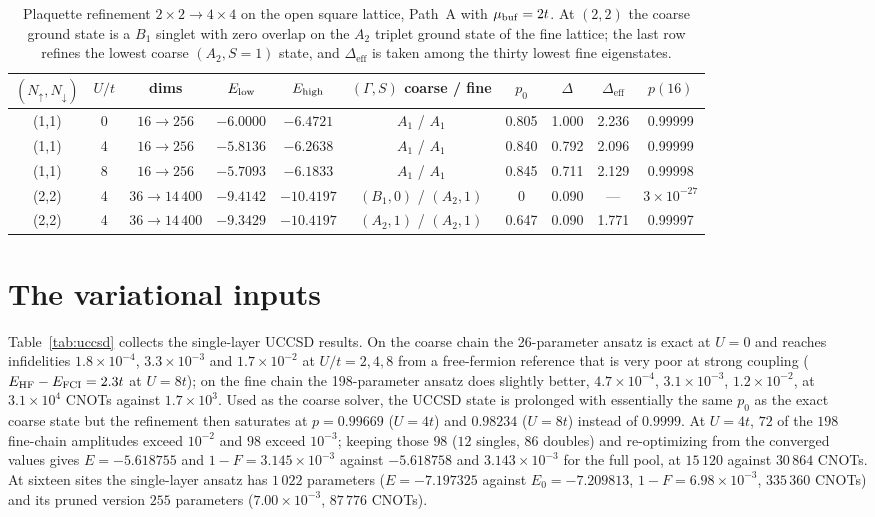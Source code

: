 \documentclass[a4paper,11pt,noarxiv]{quantumarticle}
\newcommand{\Deff}{\Delta_{\mathrm{eff}}}
\begin{document}
\begin{table}[t]
  \caption{Plaquette refinement $2\times2\to4\times4$ on the open square
  lattice, Path~A with $\mu_{\rm buf}=2t$.  At $(2,2)$ the coarse ground
  state is a $B_1$ singlet with zero overlap on the $A_2$ triplet ground
  state of the fine lattice; the last row refines the lowest coarse
  $(A_2,S=1)$ state, and $\Deff$ is taken among the thirty lowest fine
  eigenstates.}
  \label{tab:2d}
  \centering\scriptsize
  \begin{tabular}{cccccccccc}
  \toprule
  $(N_\uparrow,N_\downarrow)$ & $U/t$ & dims & $E_{\rm low}$ & $E_{\rm high}$ & $(\Gamma,S)$ coarse / fine & $p_0$ & $\Delta$ & $\Deff$ & $p(16)$\\
  \midrule
  (1,1) & 0 & $16\to256$ & $-6.0000$ & $-6.4721$ & $A_1$ / $A_1$ & 0.805 & 1.000 & 2.236 & 0.99999\\
  (1,1) & 4 & $16\to256$ & $-5.8136$ & $-6.2638$ & $A_1$ / $A_1$ & 0.840 & 0.792 & 2.096 & 0.99999\\
  (1,1) & 8 & $16\to256$ & $-5.7093$ & $-6.1833$ & $A_1$ / $A_1$ & 0.845 & 0.711 & 2.129 & 0.99998\\
  (2,2) & 4 & $36\to14\,400$ & $-9.4142$ & $-10.4197$ & $(B_1,0)$ / $(A_2,1)$ & 0 & 0.090 & --- & $3\times10^{-27}$\\
  (2,2) & 4 & $36\to14\,400$ & $-9.3429$ & $-10.4197$ & $(A_2,1)$ / $(A_2,1)$ & 0.647 & 0.090 & 1.771 & 0.99997\\
  \bottomrule
  \end{tabular}
\end{table}

\section{The variational inputs}
\label{sm:uccsd}
Table~\ref{tab:uccsd} collects the single-layer UCCSD results.  On the
coarse chain the 26-parameter ansatz is exact at $U=0$ and reaches
infidelities $1.8\times10^{-4}$, $3.3\times10^{-3}$ and $1.7\times10^{-2}$
at $U/t=2,4,8$ from a free-fermion reference that is very poor at strong
coupling ($E_{\rm HF}-E_{\rm FCI}=2.3t$ at $U=8t$); on the fine chain the
198-parameter ansatz does slightly better, $4.7\times10^{-4}$,
$3.1\times10^{-3}$, $1.2\times10^{-2}$, at $3.1\times10^4$ CNOTs against
$1.7\times10^3$.  Used as the coarse solver, the UCCSD state is prolonged
with essentially the same $p_0$ as the exact coarse state but the
refinement then saturates at $p=0.99669$ ($U=4t$) and $0.98234$ ($U=8t$)
instead of $0.9999$.  At $U=4t$, $72$ of the $198$ fine-chain amplitudes
exceed $10^{-2}$ and $98$ exceed $10^{-3}$; keeping those $98$ ($12$
singles, $86$ doubles) and re-optimizing from the converged values gives
$E=-5.618755$ and $1-F=3.145\times10^{-3}$ against $-5.618758$ and
$3.143\times10^{-3}$ for the full pool, at $15\,120$ against $30\,864$
CNOTs.  At sixteen sites the single-layer ansatz has $1\,022$ parameters
($E=-7.197325$ against $E_0=-7.209813$, $1-F=6.98\times10^{-3}$,
$335\,360$ CNOTs) and its pruned version $255$ parameters
($7.00\times10^{-3}$, $87\,776$ CNOTs).
\end{document}
